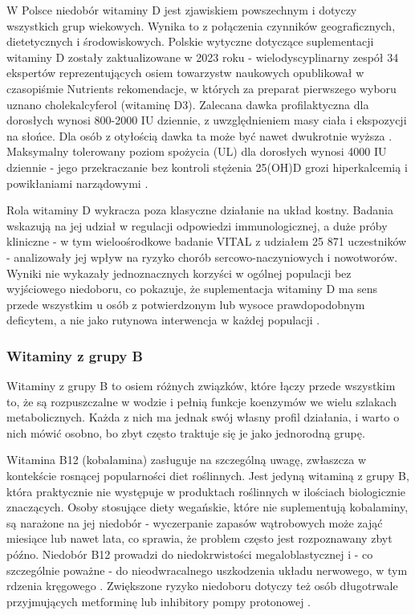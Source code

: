W Polsce niedobór witaminy D jest zjawiskiem powszechnym i dotyczy wszystkich grup wiekowych. Wynika to z połączenia czynników geograficznych, dietetycznych i środowiskowych. Polskie wytyczne dotyczące suplementacji witaminy D zostały zaktualizowane w 2023 roku - wielodyscyplinarny zespół 34 ekspertów reprezentujących osiem towarzystw naukowych opublikował w czasopiśmie Nutrients rekomendacje, w których za preparat pierwszego wyboru uznano cholekalcyferol (witaminę D3). Zalecana dawka profilaktyczna dla dorosłych wynosi 800-2000 IU dziennie, z uwzględnieniem masy ciała i ekspozycji na słońce. Dla osób z otyłością dawka ta może być nawet dwukrotnie wyższa \cite{pludowski2023guidelines}. Maksymalny tolerowany poziom spożycia (UL) dla dorosłych wynosi 4000 IU dziennie - jego przekraczanie bez kontroli stężenia 25(OH)D grozi hiperkalcemią i powikłaniami narządowymi \cite{pludowski2023guidelines}.

Rola witaminy D wykracza poza klasyczne działanie na układ kostny. Badania wskazują na jej udział w regulacji odpowiedzi immunologicznej, a duże próby kliniczne - w tym wieloośrodkowe badanie VITAL z udziałem 25 871 uczestników - analizowały jej wpływ na ryzyko chorób sercowo-naczyniowych i nowotworów. Wyniki nie wykazały jednoznacznych korzyści w ogólnej populacji bez wyjściowego niedoboru, co pokazuje, że suplementacja witaminy D ma sens przede wszystkim u osób z potwierdzonym lub wysoce prawdopodobnym deficytem, a nie jako rutynowa interwencja w każdej populacji \cite{pludowski2023guidelines}.


\subsubsection{Witaminy z grupy B}

Witaminy z grupy B to osiem różnych związków, które łączy przede wszystkim to, że są rozpuszczalne w wodzie i pełnią funkcje koenzymów we wielu szlakach metabolicznych. Każda z nich ma jednak swój własny profil działania, i warto o nich mówić osobno, bo zbyt często traktuje się je jako jednorodną grupę.

Witamina B12 (kobalamina) zasługuje na szczególną uwagę, zwłaszcza w kontekście rosnącej popularności diet roślinnych. Jest jedyną witaminą z grupy B, która praktycznie nie występuje w produktach roślinnych w ilościach biologicznie znaczących. Osoby stosujące diety wegańskie, które nie suplementują kobalaminy, są narażone na jej niedobór - wyczerpanie zapasów wątrobowych może zająć miesiące lub nawet lata, co sprawia, że problem często jest rozpoznawany zbyt późno. Niedobór B12 prowadzi do niedokrwistości megaloblastycznej i - co szczególnie poważne - do nieodwracalnego uszkodzenia układu nerwowego, w tym rdzenia kręgowego \cite{tardy2020vitamins}. Zwiększone ryzyko niedoboru dotyczy też osób długotrwale przyjmujących metforminę lub inhibitory pompy protonowej \cite{tardy2020vitamins}.

